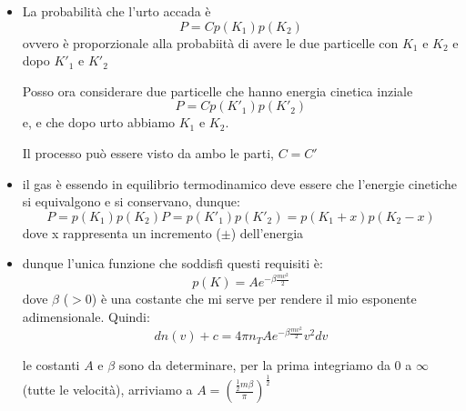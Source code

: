 \documentclass{article}
\theoremstyle{remark}
\begin{document}
\begin{itemize}
\begin{nota}
    Se consideriamo inoltre che moleco possono scontrarsi fra di loro prima di colpire l'area $A$, dobbiamo limitarci a considerare un cilindro di lunghezza $vd\tau$
    dove $\tau$ è talmente piccolo che non avvengono urti fra le molecole, esso vale $dV=v d\tau \cos(\theta)dA$. 
    
    Il numero di molecole che urterà l'area $dA$ sarà $dn(v)\frac{d\omega}{4\pi}\frac{dV}{v}$
\end{nota}







































    \item La probabilità che l'urto accada è \[P=Cp(K_1)p(K_2)\] ovvero è proporzionale alla probabiità di avere le due particelle con $K_1$ e $K_2$ e dopo $K'_1$ e $K'_2$
    
    Posso ora considerare due particelle che hanno energia cinetica inziale \[P=Cp(K'_1)p(K'_2)\]e, e che dopo urto abbiamo $K_1$ e $K_2$.

    Il processo può essere visto da ambo le parti, $C=C'$
    \item il gas è essendo in equilibrio termodinamico deve essere che l'energie cinetiche si equivalgono e si conservano, dunque:
    \[P=p(K_1)p(K_2)P=p(K'_1)p(K'_2)=p(K_1+x)p(K_2-x)\]
    dove x rappresenta un incremento ($\pm$) dell'energia
    
    \item dunque l'unica funzione che soddisfi questi requisiti è:
    \[
    p(K)=A e^{-\beta \frac{mv^2}{2}}
    \]
dove $\beta$ ($>0$) è una costante che mi serve per rendere il mio esponente adimensionale.
Quindi:
\[ dn(v)+c=4 \pi n_T A e^{-\beta \frac{mv^2}{2}} v^2 dv\] 

\begin{nota}

le costanti $A$ e $\beta$ sono da determinare, per la prima integriamo da 0 a $\infty$ (tutte le velocità), arriviamo a $A=\left( \frac{\frac{1}{2}m\beta}{\pi}\right)^\frac{1}{2}$


\end{nota}
\end{itemize}
\end{document}
